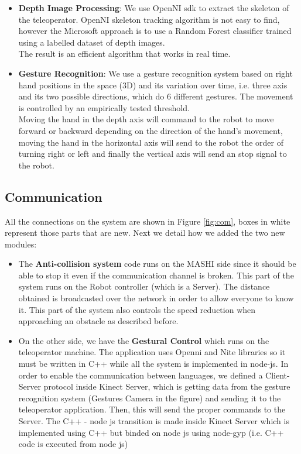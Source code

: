\begin{itemize}
	\item \textbf{Depth Image Processing}: We use OpenNI sdk to extract the skeleton of the teleoperator. OpenNI skeleton tracking algorithm is not easy to find, however the Microsoft approach is to use a Random Forest classifier trained using a labelled dataset of depth images. \\
	
	The result is an efficient algorithm that works in real time.
	
	\item \textbf{Gesture Recognition}: We use a gesture recognition system based on right hand positions in the space (3D) and its variation over time, i.e. three axis and its two possible directions, which do 6 different gestures. The movement is controlled by an empirically tested threshold.\\
		
	Moving the hand in the depth axis will command to the robot to move forward or backward depending on the direction of the hand's movement, moving the hand in the horizontal axis will send to the robot the order of turning right or left and finally the vertical axis will send an stop signal to the robot.
	
\end{itemize}

\subsection{Communication}


All the connections on the system are shown in Figure \ref{fig:com}, boxes in white represent those parts that are new. Next we detail how we added the two new modules:
\begin{itemize}
\item The \textbf{Anti-collision system} code runs on the MASHI side since it should be able to stop it even if the communication channel is broken. This part of the system runs on the Robot controller (which is a Server). The distance obtained is broadcasted over the network in order to allow everyone to know it. This part of the system also controls the speed reduction when approaching an obstacle as described before.

\item On the other side, we have the \textbf{Gestural Control} which runs on the teleoperator machine. The application uses Openni and Nite libraries so it must be written in C++ while all the system is implemented in node-js. In order to enable the communication between languages, we defined a Client-Server protocol inside Kinect Server, which is getting data from the gesture recognition system (Gestures Camera in the figure) and sending it to the teleoperator application. Then, this will send the proper commands to the Server. The C++ - node js transition is made inside Kinect Server which is implemented using C++ but binded on node js using node-gyp (i.e. C++ code is executed from node js)

\end{itemize}


